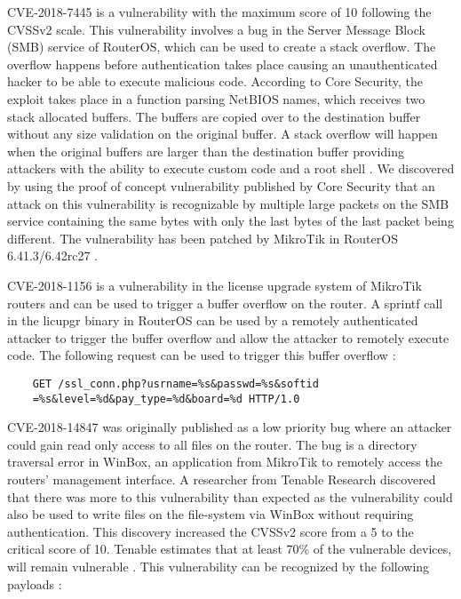 CVE-2018-7445 is a vulnerability with the maximum score of 10 following the CVSSv2 scale. This vulnerability involves a bug in the Server Message Block (SMB) service of RouterOS, which can be used to create a stack overflow. The overflow happens before authentication takes place causing an unauthenticated hacker to be able to execute malicious code. According to Core Security, the exploit takes place in a function parsing NetBIOS names, which receives two stack allocated buffers. The buffers are copied over to the destination buffer without any size validation on the original buffer. A stack overflow will happen when the original buffers are larger than the destination buffer providing attackers with the ability to execute custom code and a root shell \cite{CVE-2018-7445:CORESEC:2018}. We discovered by using the proof of concept vulnerability published by Core Security that an attack on this vulnerability is recognizable by multiple large packets on the SMB service containing the same bytes with only the last bytes of the last packet being different. The vulnerability has been patched by MikroTik in RouterOS 6.41.3/6.42rc27 \cite{CVE-2018-7445:CORESEC:2018}.

CVE-2018-1156 is a vulnerability in the license upgrade system of MikroTik routers and can be used to trigger a buffer overflow on the router. A sprintf call in the licupgr binary in RouterOS can be used by a remotely authenticated attacker to trigger the buffer overflow and allow the attacker to remotely execute code. The following request can be used to trigger this buffer overflow \cite{CVE2018-1156:Tenable:2018}:
\begin{verbatim}
    GET /ssl_conn.php?usrname=%s&passwd=%s&softid
    =%s&level=%d&pay_type=%d&board=%d HTTP/1.0
\end{verbatim}

CVE-2018-14847 was originally published as a low priority bug where an attacker could gain read only access to all files on the router. The bug is a directory traversal error in WinBox, an application from MikroTik to remotely access the routers' management interface. A researcher from Tenable Research discovered that there was more to this vulnerability than expected as the vulnerability could also be used to write files on the file-system via WinBox without requiring authentication. This discovery increased the CVSSv2 score from a 5 to the critical score of 10. Tenable estimates that at least 70\% of the vulnerable devices, will remain vulnerable \cite{CVE-2018-14847:TENABLE:2018}. This vulnerability can be recognized by the following payloads \cite{CVE-2018-14847:TENABLE:2018}:


